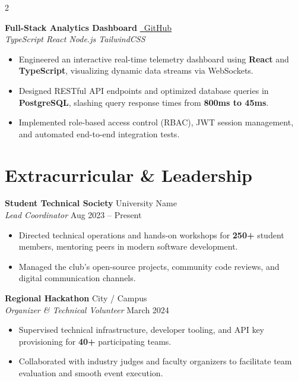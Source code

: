 \documentclass[10pt, a4paper]{article}
\newcommand{\entry}[4]{%
  \vspace{2pt}
  {\bfseries\color{bodytext} #1}\hfill{\small\color{lightgray} #3}\\
  {\small\itshape\color{accent} #2}\hfill{\small\color{lightgray} #4}
  \vspace{2pt}
}
\newenvironment{bullets}{%
  \begin{itemize}[leftmargin=1.1em, itemsep=1pt, topsep=2pt, parsep=0pt]
  \small\color{bodytext}
}{\end{itemize}}
\begin{document}
\begin{paracol}{2}
\begin{rightcolumn}
\begin{minipage}[t]{\dimexpr\linewidth-20pt}
\entry{Full-Stack Analytics Dashboard}%
      {TypeScript \textbullet{} React \textbullet{} Node.js \textbullet{} TailwindCSS}%
      {\href{https://github.com/yourusername/project3}{\faIcon{github}~GitHub}}%
      {}
\begin{bullets}
  \item Engineered an interactive real-time telemetry dashboard using \textbf{React} and \textbf{TypeScript}, visualizing dynamic data streams via WebSockets.
  \item Designed RESTful API endpoints and optimized database queries in \textbf{PostgreSQL}, slashing query response times from \textbf{800ms to 45ms}.
  \item Implemented role-based access control (RBAC), JWT session management, and automated end-to-end integration tests.
\end{bullets}

\vspace{4pt}

\section{Extracurricular \& Leadership}

\entry{Student Technical Society}{Lead Coordinator}{University Name}{Aug 2023 -- Present}
\begin{bullets}
  \item Directed technical operations and hands-on workshops for \textbf{250+} student members, mentoring peers in modern software development.
  \item Managed the club's open-source projects, community code reviews, and digital communication channels.
\end{bullets}

\vspace{4pt}

\entry{Regional Hackathon}{Organizer \& Technical Volunteer}{City / Campus}{March 2024}
\begin{bullets}
  \item Supervised technical infrastructure, developer tooling, and API key provisioning for \textbf{40+} participating teams.
  \item Collaborated with industry judges and faculty organizers to facilitate team evaluation and smooth event execution.
\end{bullets}

\end{minipage}
\end{rightcolumn}

\end{paracol}
\end{document}
